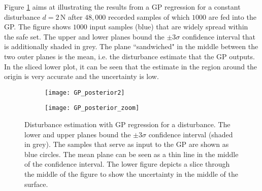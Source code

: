 \documentclass[../main.tex]{subfiles}
\begin{document}
Figure \ref{fig:GP_posterior} aims at illustrating the results from a GP regression for a constant disturbance $d = 2 \, \text{N}$ after $48,000$ recorded samples of which $1000$ are fed into the GP. The figure shows $1000$ input samples (blue) that are widely spread within the safe set. The upper and lower planes bound the $\pm 3\sigma$ confidence interval that is additionally shaded in grey. The plane ``sandwiched" in the middle between the two outer planes is the mean, i.e. the disturbance estimate that the GP outputs. In the sliced lower plot, it can be seen that the estimate in the region around the origin is very accurate and the uncertainty is low.
\begin{figure}
    \centering
    \begin{subfigure}[t]{\textwidth}
        \texttt{[image: GP\_posterior2]}
    \end{subfigure}
    
    \begin{subfigure}[t]{\textwidth}
        \texttt{[image: GP\_posterior\_zoom]}
        \end{subfigure}    \caption{Disturbance estimation with GP regression for a disturbance. The lower and upper planes bound the $\pm 3\sigma$ confidence interval (shaded in grey). The samples that serve as input to the GP are shown as blue circles. The mean plane can be seen as a thin line in the middle of the confidence interval. The lower figure depicts a slice through the middle of the figure to show the uncertainty in the middle of the surface.}  \label{fig:GP_posterior}
\end{figure}
\end{document}
